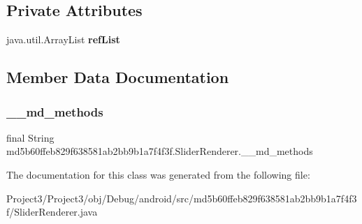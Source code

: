 \subsection*{Private Attributes}
\begin{DoxyCompactItemize}
\item 
\mbox{\label{classmd5b60ffeb829f638581ab2bb9b1a7f4f3f_1_1SliderRenderer_a9a55916f662fc8ad22d378850e0c8e13}} 
java.\+util.\+Array\+List {\bfseries ref\+List}
\end{DoxyCompactItemize}


\subsection{Member Data Documentation}
\mbox{\label{classmd5b60ffeb829f638581ab2bb9b1a7f4f3f_1_1SliderRenderer_abd36f56a20d51aa82400faf5b2db4536}} 
\subsubsection{\texorpdfstring{\+\_\+\+\_\+md\+\_\+methods}{\_\_md\_methods}}
{\footnotesize\ttfamily final String md5b60ffeb829f638581ab2bb9b1a7f4f3f.\+Slider\+Renderer.\+\_\+\+\_\+md\+\_\+methods\hspace{0.3cm}{\ttfamily [static]}}



The documentation for this class was generated from the following file\+:\begin{DoxyCompactItemize}
\item 
Project3/\+Project3/obj/\+Debug/android/src/md5b60ffeb829f638581ab2bb9b1a7f4f3f/Slider\+Renderer.\+java\end{DoxyCompactItemize}
